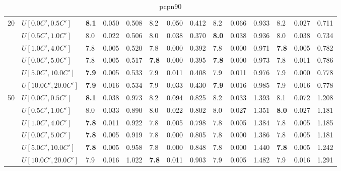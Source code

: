 \begin{table}[h]
{\begin{tabular}{|l|l||l|l|l||l|l|l||l|l|l||l|l|l|}
      \hline\hline
      \multirow{6}{*}{20} & $U[0.0C',0.5C']$ & \textbf{8.1} & 0.050 & 0.508 & 8.2 & 0.050 & 0.412 & 8.2 & 0.066 & 0.933 & 8.2 & 0.027 & 0.711 \\
       & $U[0.5C',1.0C']$ & 8.0 & 0.022 & 0.506 & 8.0 & 0.038 & 0.370 & \textbf{8.0} & 0.038 & 0.936 & 8.0 & 0.038 & 0.734 \\
       & $U[1.0C',4.0C']$ & 7.8 & 0.005 & 0.520 & 7.8 & 0.000 & 0.392 & 7.8 & 0.000 & 0.971 & \textbf{7.8} & 0.005 & 0.782 \\
       & $U[0.0C',5.0C']$ & 7.8 & 0.005 & 0.517 & \textbf{7.8} & 0.000 & 0.395 & \textbf{7.8} & 0.000 & 0.973 & 7.8 & 0.011 & 0.786 \\
       & $U[5.0C',10.0C']$ & \textbf{7.9} & 0.005 & 0.533 & 7.9 & 0.011 & 0.408 & 7.9 & 0.011 & 0.976 & 7.9 & 0.000 & 0.778 \\
       & $U[10.0C',20.0C']$ & \textbf{7.9} & 0.016 & 0.534 & 7.9 & 0.033 & 0.430 & \textbf{7.9} & 0.016 & 0.985 & 7.9 & 0.016 & 0.778 \\
      \hline\hline
      \multirow{6}{*}{50} & $U[0.0C',0.5C']$ & \textbf{8.1} & 0.038 & 0.973 & 8.2 & 0.094 & 0.825 & 8.2 & 0.033 & 1.393 & 8.1 & 0.072 & 1.208 \\
       & $U[0.5C',1.0C']$ & 8.0 & 0.033 & 0.890 & 8.0 & 0.022 & 0.802 & 8.0 & 0.027 & 1.351 & \textbf{8.0} & 0.027 & 1.181 \\
       & $U[1.0C',4.0C']$ & \textbf{7.8} & 0.011 & 0.922 & 7.8 & 0.005 & 0.798 & 7.8 & 0.005 & 1.384 & 7.8 & 0.005 & 1.185 \\
       & $U[0.0C',5.0C']$ & \textbf{7.8} & 0.005 & 0.919 & 7.8 & 0.000 & 0.805 & 7.8 & 0.000 & 1.386 & 7.8 & 0.005 & 1.181 \\
       & $U[5.0C',10.0C']$ & \textbf{7.8} & 0.005 & 0.958 & 7.8 & 0.000 & 0.848 & 7.8 & 0.000 & 1.440 & \textbf{7.8} & 0.005 & 1.242 \\
       & $U[10.0C',20.0C']$ & 7.9 & 0.016 & 1.022 & \textbf{7.8} & 0.011 & 0.903 & 7.9 & 0.005 & 1.482 & 7.9 & 0.016 & 1.291 \\
      \hline
      \end{tabular}
      }
      \caption{pcpn90}
      \label{tab:pcpn90ILPVariant}
      \end{table}
      
